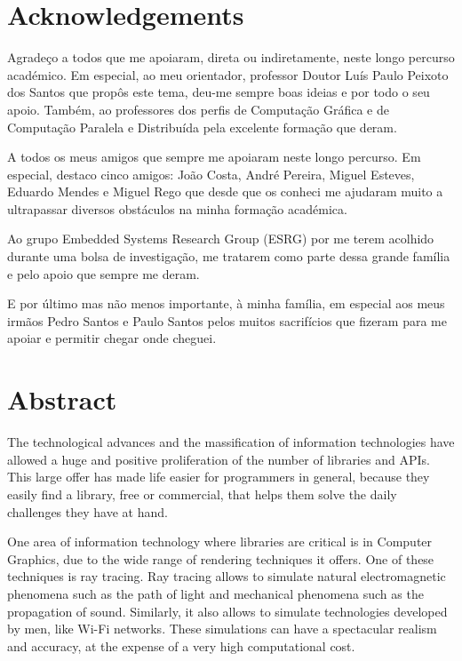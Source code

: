 \documentclass[
  oneside,
  11pt, a4paper,
  footinclude=true,
  headinclude=true,
  cleardoublepage=empty,
  bibliography=totocnumbered
]{scrbook}
\author{Tiago Manuel da Silva Santos}
\date{\myear} %
\begin{document}
\umfrontcover
\umtitlepage
	
\chapter*{Acknowledgements}

\par
Agradeço a todos que me apoiaram, direta ou indiretamente, neste longo percurso académico.
Em especial, ao meu orientador, professor Doutor Luís Paulo Peixoto dos Santos que propôs
este tema, deu-me sempre boas ideias e por todo o seu apoio.
Também, ao professores dos perfis de Computação Gráfica e de Computação Paralela e Distribuída pela excelente formação que deram.

\par
A todos os meus amigos que sempre me apoiaram neste longo percurso.
Em especial, destaco cinco amigos: João Costa, André Pereira, Miguel Esteves, Eduardo Mendes e Miguel Rego que desde que os conheci me ajudaram muito a ultrapassar diversos obstáculos na minha formação académica.

\par
Ao grupo Embedded Systems Research Group (ESRG) por me terem acolhido durante uma bolsa de investigação, me tratarem como parte dessa grande família e pelo apoio que sempre me deram.

\par
E por último mas não menos importante, à minha família, em especial aos meus irmãos Pedro Santos e Paulo Santos pelos muitos sacrifícios que fizeram para me apoiar e permitir chegar onde cheguei.

\chapter*{Abstract}

\par
The technological advances and the massification of information technologies have allowed a huge and positive proliferation of the number of libraries and APIs.
This large offer has made life easier for programmers in general, because they easily find a library, free or commercial, that helps them solve the daily challenges they have at hand.

\par
One area of information technology where libraries are critical is in Computer Graphics, due to the wide range of rendering techniques it offers.
One of these techniques is ray tracing.
Ray tracing allows to simulate natural electromagnetic phenomena such as the path of light and mechanical phenomena such as the propagation of sound.
Similarly, it also allows to simulate technologies developed by men, like Wi-Fi networks.
These simulations can have a spectacular realism and accuracy, at the expense of a very high computational cost.
\end{document}
